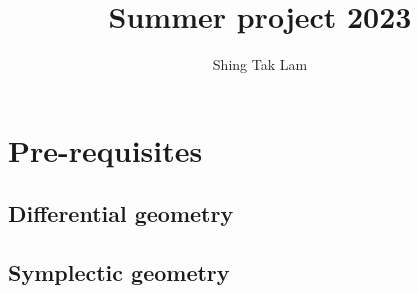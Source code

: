 \documentclass{report}
\title{Summer project 2023}
\author{Shing Tak Lam}
\begin{document}
\maketitle

\tableofcontents

\part{Pre-requisites}

\chapter{Differential geometry}










\chapter{Symplectic geometry}





\end{document}
